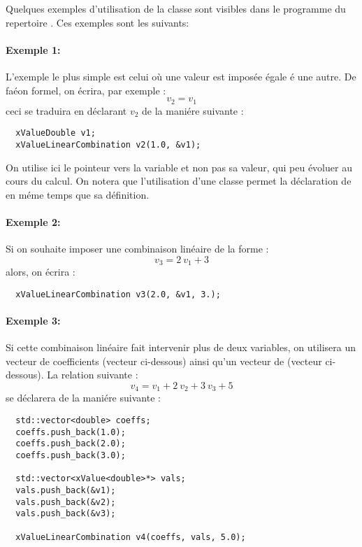 Quelques exemples d'utilisation de la classe
 sont visibles dans le programme
 du repertoire . Ces exemples
sont les suivants:

\paragraph{Exemple 1:}

L'exemple le plus simple est celui o\`u une valeur est impos\'ee \'egale \'e
une autre. De fa\'eon formel, on \'ecrira, par exemple :
\begin{equation}
    v_2 =  v_1
\end{equation}
ceci se traduira en d\'eclarant $v_2$ de la mani\'ere suivante :
\begin{verbatim}
  xValueDouble v1;
  xValueLinearCombination v2(1.0, &v1);
\end{verbatim}
On utilise ici le pointeur vers la variable  et non pas sa
valeur, qui peu \'evoluer au cours du calcul. On notera que
l'utilisation d'une classe permet la d\'eclaration de  en
m\'eme temps que sa d\'efinition.

\paragraph{Exemple 2:}

Si on souhaite imposer une combinaison lin\'eaire de la forme :
\begin{equation}
    v_3 = 2~v_1 + 3
\end{equation}
alors, on \'ecrira :
\begin{verbatim}
  xValueLinearCombination v3(2.0, &v1, 3.);
\end{verbatim}

\paragraph{Exemple 3:}

Si cette combinaison lin\'eaire fait intervenir plus de deux
variables, on utilisera  un vecteur de coefficients (vecteur
 ci-dessous) ainsi qu'un vecteur de 
(vecteur  ci-dessous). La relation suivante :
\begin{equation}
    v_4 = v_1 + 2~v_2 + 3~v_3 + 5
\end{equation}
se d\'eclarera de la mani\'ere suivante :
\begin{verbatim}
  std::vector<double> coeffs;
  coeffs.push_back(1.0);
  coeffs.push_back(2.0);
  coeffs.push_back(3.0);

  std::vector<xValue<double>*> vals;
  vals.push_back(&v1);
  vals.push_back(&v2);
  vals.push_back(&v3);

  xValueLinearCombination v4(coeffs, vals, 5.0);
\end{verbatim}



